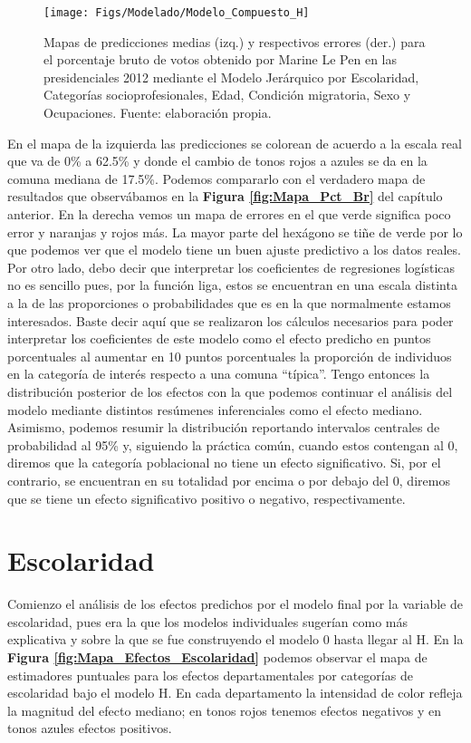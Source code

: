 \begin{figure}[h]
	\centering
	\texttt{[image: Figs/Modelado/Modelo\_Compuesto\_H]}
	\caption{Mapas de predicciones medias (izq.) y respectivos errores (der.) para el porcentaje bruto de votos obtenido por Marine Le Pen en las presidenciales 2012 mediante el Modelo Jerárquico por Escolaridad, Categorías socioprofesionales, Edad, Condición migratoria, Sexo y Ocupaciones. Fuente: elaboración propia.}
	\label{fig:Modelo_Compuesto_H}
\end{figure}

En el mapa de la izquierda las predicciones se colorean de acuerdo a la escala real que va de 0\% a 62.5\% y donde el cambio de tonos rojos a azules se da en la comuna mediana de 17.5\%. Podemos compararlo con el verdadero mapa de resultados que observábamos en la \textbf{Figura \ref{fig:Mapa_Pct_Br}} del capítulo anterior. En la derecha vemos un mapa de errores en el que verde significa poco error y naranjas y rojos más. La mayor parte del hexágono se tiñe de verde por lo que podemos ver que el modelo tiene un buen ajuste predictivo a los datos reales.\\

Por otro lado, debo decir que interpretar los coeficientes de regresiones logísticas no es sencillo pues, por la función liga, estos se encuentran en una escala distinta a la de las proporciones o probabilidades que es en la que normalmente estamos interesados. Baste decir aquí que se realizaron los cálculos necesarios para poder interpretar los coeficientes de este modelo como el efecto predicho en puntos porcentuales al aumentar en 10 puntos porcentuales la proporción de individuos en la categoría de interés respecto a una comuna ``típica''. Tengo entonces la distribución posterior de los efectos con la que podemos continuar el análisis del modelo mediante distintos resúmenes inferenciales como el efecto mediano. Asimismo, podemos resumir la distribución reportando intervalos centrales de probabilidad al 95\% y, siguiendo la práctica común, cuando estos contengan al 0, diremos que la categoría poblacional no tiene un efecto significativo. Si, por el contrario, se encuentran en su totalidad por encima o por debajo del 0, diremos que se tiene un efecto significativo positivo o negativo, respectivamente.

\section{Escolaridad}

Comienzo el análisis de los efectos predichos por el modelo final por la variable de escolaridad, pues era la que los modelos individuales sugerían como más explicativa y sobre la que se fue construyendo el modelo 0 hasta llegar al H. En la \textbf{Figura \ref{fig:Mapa_Efectos_Escolaridad}} podemos observar el mapa de estimadores puntuales para los efectos departamentales por categorías de escolaridad bajo el modelo H. En cada departamento la intensidad de color refleja la magnitud del efecto mediano; en tonos rojos tenemos efectos negativos y en tonos azules efectos positivos.\\

